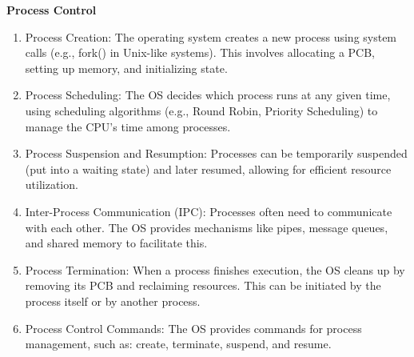 \documentclass{article}
\begin{document}
\noindent\textbf{Process Control}
\begin{enumerate}
\item Process Creation: The operating system creates a new process using system calls (e.g., fork() in Unix-like systems). This involves allocating a PCB, setting up memory, and initializing state.
\item Process Scheduling: The OS decides which process runs at any given time, using scheduling algorithms (e.g., Round Robin, Priority Scheduling) to manage the CPU’s time among processes.
\item Process Suspension and Resumption: Processes can be temporarily suspended (put into a waiting state) and later resumed, allowing for efficient resource utilization.
\item Inter-Process Communication (IPC): Processes often need to communicate with each other. The OS provides mechanisms like pipes, message queues, and shared memory to facilitate this.
\item Process Termination: When a process finishes execution, the OS cleans up by removing its PCB and reclaiming resources. This can be initiated by the process itself or by another process.
\item Process Control Commands: The OS provides commands for process management, such as: create, terminate, suspend, and resume.
\end{enumerate}
\end{document}
